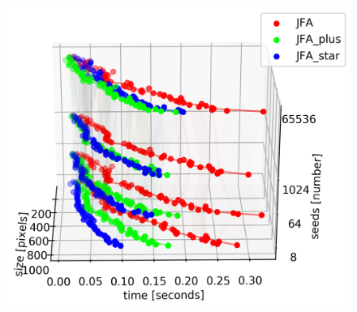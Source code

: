 \documentclass[aspectratio=169, 22pt]{beamer}
\begin{document}
\begin{frame}

\begin{figure}
\centering
\includegraphics[width=0.65\linewidth]{./figure_3d.png}
\label{fig:test}
\end{figure}

\end{frame}

\end{document}
